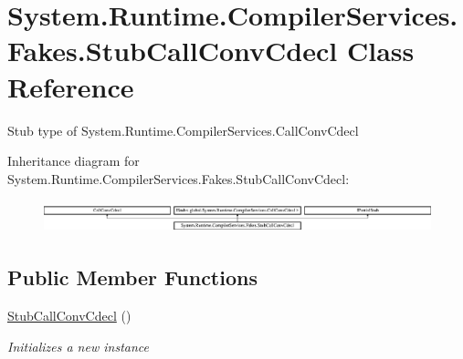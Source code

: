 \hypertarget{class_system_1_1_runtime_1_1_compiler_services_1_1_fakes_1_1_stub_call_conv_cdecl}{\section{System.\-Runtime.\-Compiler\-Services.\-Fakes.\-Stub\-Call\-Conv\-Cdecl Class Reference}
\label{class_system_1_1_runtime_1_1_compiler_services_1_1_fakes_1_1_stub_call_conv_cdecl}
}


Stub type of System.\-Runtime.\-Compiler\-Services.\-Call\-Conv\-Cdecl 


Inheritance diagram for System.\-Runtime.\-Compiler\-Services.\-Fakes.\-Stub\-Call\-Conv\-Cdecl\-:\begin{figure}[H]
\begin{center}
\leavevmode
\includegraphics[height=0.954817cm]{class_system_1_1_runtime_1_1_compiler_services_1_1_fakes_1_1_stub_call_conv_cdecl}
\end{center}
\end{figure}
\subsection*{Public Member Functions}
\begin{DoxyCompactItemize}
\item 
\hyperlink{class_system_1_1_runtime_1_1_compiler_services_1_1_fakes_1_1_stub_call_conv_cdecl_a4fee1054c43768b42536315e4f4d6484}{Stub\-Call\-Conv\-Cdecl} ()
\begin{DoxyCompactList}\small\item\em Initializes a new instance\end{DoxyCompactList}\end{DoxyCompactItemize}
